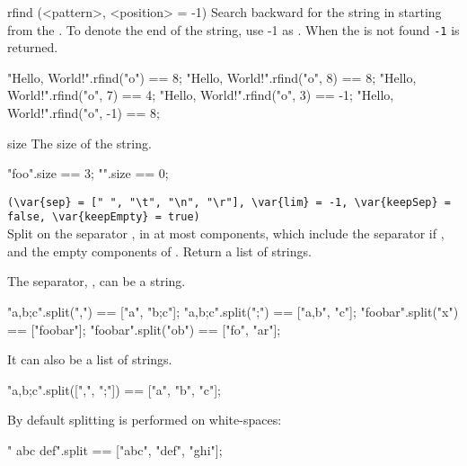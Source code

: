 \begin{urbiscriptapi}
\item[rfind](<pattern>, <position> = -1)%
  Search backward for the  string in \this starting from the
  .  To denote the end of the string, use -1 as
  .  When the  is not found \lstinline|-1| is
  returned.
\begin{urbiassert}
"Hello, World!".rfind("o")     == 8;
"Hello, World!".rfind("o", 8)  == 8;
"Hello, World!".rfind("o", 7)  == 4;
"Hello, World!".rfind("o", 3)  == -1;
"Hello, World!".rfind("o", -1) == 8;
\end{urbiassert}


\item[size]
  The size of the string.
\begin{urbiassert}
"foo".size == 3;
   "".size == 0;
\end{urbiassert}


\item {}%
  \lstinline|(\var{sep} = [" ", "\t", "\n", "\r"], \var{lim} = -1, \var{keepSep} = false, \var{keepEmpty} = true)|\\
  Split \this on the separator , in at most 
  components, which include the separator if , and the
  empty components of .  Return a list of strings.

  The separator, , can be a string.

\begin{urbiassert}
       "a,b;c".split(",") == ["a", "b;c"];
       "a,b;c".split(";") == ["a,b", "c"];
      "foobar".split("x") == ["foobar"];
     "foobar".split("ob") == ["fo", "ar"];
\end{urbiassert}

\noindent
It can also be a list of strings.

\begin{urbiassert}
"a,b;c".split([",", ";"]) == ["a", "b", "c"];
\end{urbiassert}

\noindent
By default splitting is performed on white-spaces:

\begin{urbiassert}
"  abc  def\tghi\n".split == ["abc", "def", "ghi"];
\end{urbiassert}


\end{urbiscriptapi}

